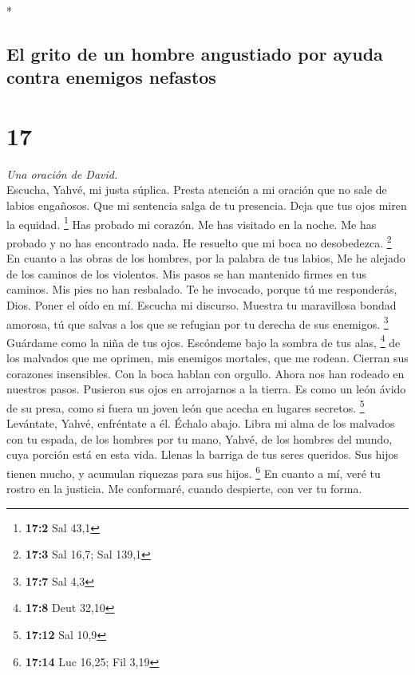 \begin{paracol}{2}
\begin{otherlanguage}{english}
\end{otherlanguage}

\switchcolumn[0]*

\hypertarget{el-grito-de-un-hombre-angustiado-por-ayuda-contra-enemigos-nefastos}{%
\subsection{El grito de un hombre angustiado por ayuda contra enemigos
nefastos}\label{el-grito-de-un-hombre-angustiado-por-ayuda-contra-enemigos-nefastos}}

\hypertarget{section-32}{%
\section{17}\label{section-32}}

\emph{Una oración de David.}\\
 Escucha, Yahvé, mi justa súplica. Presta atención a mi
oración que no sale de labios engañosos.  Que mi sentencia
salga de tu presencia. Deja que tus ojos miren la equidad. \footnote{\textbf{17:2}
  Sal 43,1}  Has probado mi corazón. Me has visitado en la
noche. Me has probado y no has encontrado nada. He resuelto que mi boca
no desobedezca. \footnote{\textbf{17:3} Sal 16,7; Sal 139,1}
 En cuanto a las obras de los hombres, por la palabra de
tus labios, Me he alejado de los caminos de los violentos.
 Mis pasos se han mantenido firmes en tus caminos. Mis
pies no han resbalado.  Te he invocado, porque tú me
responderás, Dios. Poner el oído en mí. Escucha mi discurso.
 Muestra tu maravillosa bondad amorosa, tú que salvas a
los que se refugian por tu derecha de sus enemigos. \footnote{\textbf{17:7}
  Sal 4,3}  Guárdame como la niña de tus ojos. Escóndeme
bajo la sombra de tus alas, \footnote{\textbf{17:8} Deut 32,10}
 de los malvados que me oprimen, mis enemigos mortales,
que me rodean.  Cierran sus corazones insensibles. Con la
boca hablan con orgullo.  Ahora nos han rodeado en
nuestros pasos. Pusieron sus ojos en arrojarnos a la tierra.
 Es como un león ávido de su presa, como si fuera un
joven león que acecha en lugares secretos. \footnote{\textbf{17:12} Sal
  10,9}  Levántate, Yahvé, enfréntate a él. Échalo abajo.
Libra mi alma de los malvados con tu espada,  de los
hombres por tu mano, Yahvé, de los hombres del mundo, cuya porción está
en esta vida. Llenas la barriga de tus seres queridos. Sus hijos tienen
mucho, y acumulan riquezas para sus hijos. \footnote{\textbf{17:14} Luc
  16,25; Fil 3,19}  En cuanto a mí, veré tu rostro en la
justicia. Me conformaré, cuando despierte, con ver tu forma.


\end{paracol}
